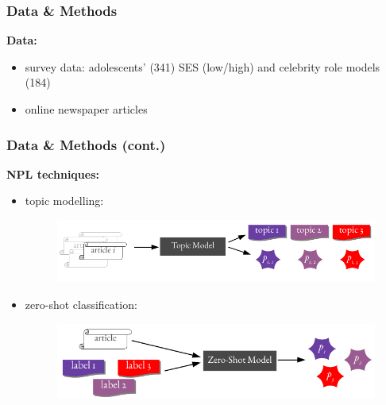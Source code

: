 \begin{frame}
	\frametitle{Data \& Methods}
	\textbf{Data:}
	\begin{itemize}
		\item<+-> survey data: adolescents' (341) SES (low/high) and celebrity role models (184)
		\item<+-> online newspaper articles
	\end{itemize}
\end{frame}
\begin{frame}
	\frametitle{Data \& Methods (cont.)}
	\textbf{NPL techniques:}
	\begin{itemize}
		\item <+-> topic modelling:
		\begin{figure}
			\centering
			\includegraphics[scale=1]{img/topic_modelling_schema_simple.pdf}
		\end{figure}
		\item <+-> zero-shot classification:
		\begin{figure}
			\centering
			\includegraphics[scale=1]{img/zero_shot_schema_simple.pdf}
		\end{figure}
	\end{itemize}
\end{frame}


